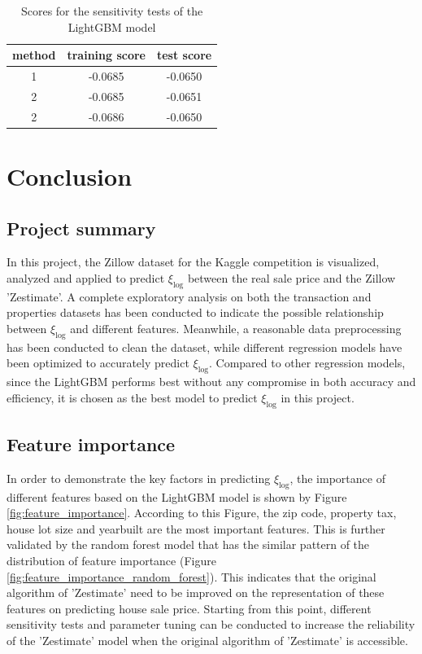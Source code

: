 \documentclass[12pt]{article}
\begin{document}
\begin{table}[!ht]
	\centering
	\footnotesize
	\caption{Scores for the sensitivity tests of the LightGBM model}
	\label{tab:score-sensitivity-test}
	\begin{tabular}{|c|c|c|}
		\hline method & training score & test score\\  
		\hline  1 & -0.0685 & -0.0650\\
		\hline  2 & -0.0685 & -0.0651\\
		\hline  2 & -0.0686 & -0.0650\\
		\hline
	\end{tabular} 
\end{table}

\section{Conclusion}\label{sec:conclusion}
\subsection{Project summary}
In this project, the Zillow dataset for the Kaggle competition is visualized, analyzed and applied to predict $\xi_{\log}$ between the real sale price and the Zillow 'Zestimate'. A complete exploratory analysis on both the transaction and properties datasets has been conducted to indicate the possible relationship between $\xi_{\log}$ and different features. Meanwhile, a reasonable data preprocessing has been conducted to clean the dataset, while different regression models have been optimized to accurately predict $\xi_{\log}$. Compared to other regression models, since the LightGBM performs best without any compromise in both accuracy and efficiency, it is chosen as the best model to predict $\xi_{\log}$ in this project.

\subsection{Feature importance}
In order to demonstrate the key factors in predicting $\xi_{\log}$, the importance of different features based on the LightGBM model is shown by Figure \ref{fig:feature_importance}. According to this Figure, the zip code, property tax, house lot size and yearbuilt are the most important features. This is further validated by the random forest model that has the similar pattern of the distribution of feature importance (Figure \ref{fig:feature_importance_random_forest}). This indicates that the original algorithm of 'Zestimate' need to be improved on the representation of these features on predicting house sale price. Starting from this point, different sensitivity tests and parameter tuning can be conducted to increase the reliability of the 'Zestimate' model when the original algorithm of 'Zestimate' is accessible.
\end{document}
